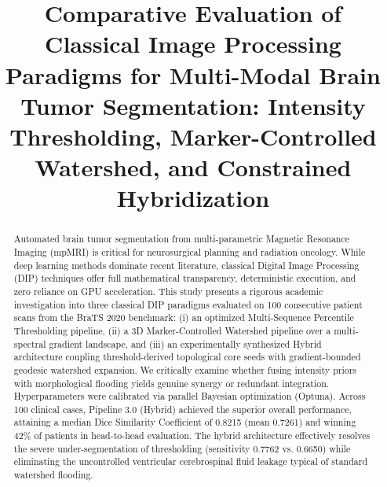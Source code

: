 \documentclass[10pt,conference]{IEEEtran}
\begin{document}
\title{Comparative Evaluation of Classical Image Processing Paradigms for Multi-Modal Brain Tumor Segmentation: Intensity Thresholding, Marker-Controlled Watershed, and Constrained Hybridization}

\author{
}

\maketitle

\begin{abstract}
Automated brain tumor segmentation from multi-parametric Magnetic Resonance Imaging (mpMRI) is critical for neurosurgical planning and radiation oncology. While deep learning methods dominate recent literature, classical Digital Image Processing (DIP) techniques offer full mathematical transparency, deterministic execution, and zero reliance on GPU acceleration. This study presents a rigorous academic investigation into three classical DIP paradigms evaluated on 100 consecutive patient scans from the BraTS 2020 benchmark: (i) an optimized Multi-Sequence Percentile Thresholding pipeline, (ii) a 3D Marker-Controlled Watershed pipeline over a multi-spectral gradient landscape, and (iii) an experimentally synthesized Hybrid architecture coupling threshold-derived topological core seeds with gradient-bounded geodesic watershed expansion. We critically examine whether fusing intensity priors with morphological flooding yields genuine synergy or redundant integration. Hyperparameters were calibrated via parallel Bayesian optimization (Optuna). Across 100 clinical cases, Pipeline 3.0 (Hybrid) achieved the superior overall performance, attaining a median Dice Similarity Coefficient of 0.8215 (mean 0.7261) and winning 42\% of patients in head-to-head evaluation. The hybrid architecture effectively resolves the severe under-segmentation of thresholding (sensitivity 0.7762 vs. 0.6650) while eliminating the uncontrolled ventricular cerebrospinal fluid leakage typical of standard watershed flooding.
\end{abstract}
\end{document}
